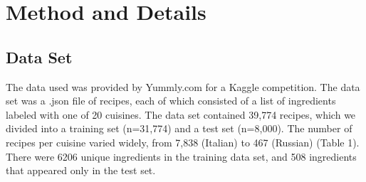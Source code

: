 \documentclass[11pt]{article}
\begin{document}
\section{Method and Details}




\subsection{Data Set}
The data used was provided by Yummly.com for a Kaggle competition. The data set was a .json file of recipes, each of which consisted of a list of ingredients labeled with one of 20 cuisines. The data set contained
39,774 recipes, which we divided into a training set (n=31,774) and a test set (n=8,000).
The number of recipes per cuisine varied widely, from 7,838 (Italian) to 467 (Russian) (Table 1). There were 6206 unique ingredients in the training data set, and 508 ingredients that appeared only in the test set.
\end{document}
